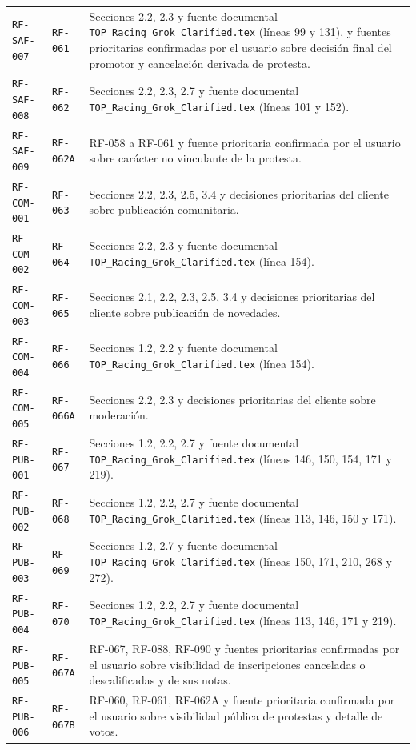 \documentclass[10pt,letterpaper]{article}
\begin{document}
\begin{landscape}
\begin{longtable}{P{2.7cm}P{2.6cm}P{15.7cm}}
\texttt{RF-SAF-007} & \texttt{RF-061} & Secciones 2.2, 2.3 y fuente documental \texttt{TOP\_Racing\_Grok\_Clarified.tex} (líneas 99 y 131), y fuentes prioritarias confirmadas por el usuario sobre decisión final del promotor y cancelación derivada de protesta.\\
\texttt{RF-SAF-008} & \texttt{RF-062} & Secciones 2.2, 2.3, 2.7 y fuente documental \texttt{TOP\_Racing\_Grok\_Clarified.tex} (líneas 101 y 152).\\
\texttt{RF-SAF-009} & \texttt{RF-062A} & RF-058 a RF-061 y fuente prioritaria confirmada por el usuario sobre carácter no vinculante de la protesta.\\
\texttt{RF-COM-001} & \texttt{RF-063} & Secciones 2.2, 2.3, 2.5, 3.4 y decisiones prioritarias del cliente sobre publicación comunitaria.\\
\texttt{RF-COM-002} & \texttt{RF-064} & Secciones 2.2, 2.3 y fuente documental \texttt{TOP\_Racing\_Grok\_Clarified.tex} (línea 154).\\
\texttt{RF-COM-003} & \texttt{RF-065} & Secciones 2.1, 2.2, 2.3, 2.5, 3.4 y decisiones prioritarias del cliente sobre publicación de novedades.\\
\texttt{RF-COM-004} & \texttt{RF-066} & Secciones 1.2, 2.2 y fuente documental \texttt{TOP\_Racing\_Grok\_Clarified.tex} (línea 154).\\
\texttt{RF-COM-005} & \texttt{RF-066A} & Secciones 2.2, 2.3 y decisiones prioritarias del cliente sobre moderación.\\
\texttt{RF-PUB-001} & \texttt{RF-067} & Secciones 1.2, 2.2, 2.7 y fuente documental \texttt{TOP\_Racing\_Grok\_Clarified.tex} (líneas 146, 150, 154, 171 y 219).\\
\texttt{RF-PUB-002} & \texttt{RF-068} & Secciones 1.2, 2.2, 2.7 y fuente documental \texttt{TOP\_Racing\_Grok\_Clarified.tex} (líneas 113, 146, 150 y 171).\\
\texttt{RF-PUB-003} & \texttt{RF-069} & Secciones 1.2, 2.7 y fuente documental \texttt{TOP\_Racing\_Grok\_Clarified.tex} (líneas 150, 171, 210, 268 y 272).\\
\texttt{RF-PUB-004} & \texttt{RF-070} & Secciones 1.2, 2.2, 2.7 y fuente documental \texttt{TOP\_Racing\_Grok\_Clarified.tex} (líneas 113, 146, 171 y 219).\\
\texttt{RF-PUB-005} & \texttt{RF-067A} & RF-067, RF-088, RF-090 y fuentes prioritarias confirmadas por el usuario sobre visibilidad de inscripciones canceladas o descalificadas y de sus notas.\\
\texttt{RF-PUB-006} & \texttt{RF-067B} & RF-060, RF-061, RF-062A y fuente prioritaria confirmada por el usuario sobre visibilidad pública de protestas y detalle de votos.\\

\end{longtable}
\end{landscape}
\end{document}
